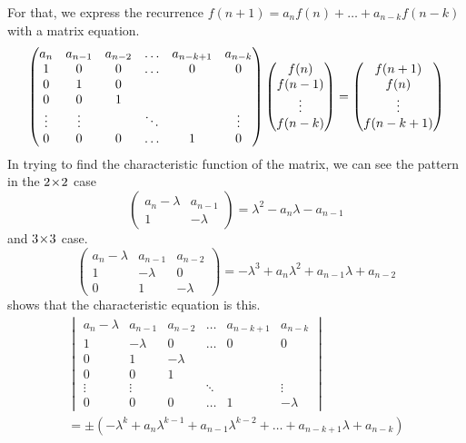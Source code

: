 For that, we express
the recurrence $f(n+1)=a_nf(n)+\dots+a_{n-k}f(n-k)$
with a matrix equation.
\begin{equation*}
  \begin{pmatrix}
    a_n  &a_{n-1}  &a_{n-2}  &\ldots  &a_{n-k+1} &a_{n-k}  \\
    1    &0        &0        &\ldots  &0         &0        \\
    0    &1        &0                                      \\
    0    &0        &1                                      \\
    \vdots &\vdots &         &\ddots  &           &\vdots  \\
    0    &0        &0        &\ldots   &1          &0
  \end{pmatrix}
  \begin{pmatrix} f(n) \\ f(n-1) \\ \vdots  \\ f(n-k) \end{pmatrix}
  =
  \begin{pmatrix} f(n+1) \\ f(n) \\ \vdots  \\ f(n-k+1) \end{pmatrix}
\end{equation*}
In trying to find the characteristic function of the matrix,
we can see the pattern in the $2 \! \times \! 2$ case 
\begin{equation*}
  \begin{pmatrix}
    a_n-\lambda  &a_{n-1} \\
    1            &-\lambda
  \end{pmatrix}
  =\lambda^2-a_n\lambda-a_{n-1}
\end{equation*}
and $3 \! \times \! 3$ case.
\begin{equation*}
  \begin{pmatrix}
    a_n-\lambda  &a_{n-1}   &a_{n-2}  \\
    1            &-\lambda  &0        \\
    0            &1         &-\lambda
  \end{pmatrix}
  =-\lambda^3+a_n\lambda^2+a_{n-1}\lambda+a_{n-2}
\end{equation*}
 shows that
the characteristic equation is this.
\begin{multline*}
  \begin{vmatrix}
    a_n-\lambda &a_{n-1}  &a_{n-2}  &\ldots  &a_{n-k+1} &a_{n-k}  \\
    1    &-\lambda &0        &\ldots  &0         &0        \\
    0    &1        &-\lambda                                      \\
    0    &0        &1                                      \\
    \vdots &\vdots &         &\ddots   &           &\vdots  \\
    0    &0        &0        &\ldots   &1          &-\lambda
  \end{vmatrix}                                                          \\
  =\pm(-\lambda^k+a_n\lambda^{k-1}+a_{n-1}\lambda^{k-2}
       +\dots+a_{n-k+1}\lambda+a_{n-k})
\end{multline*}
